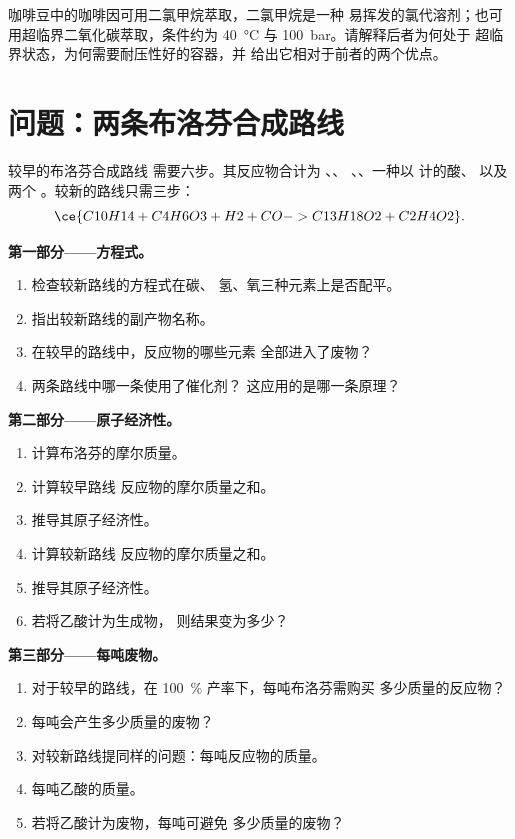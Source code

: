 \begin{exercise}[$\star\star\star$]\label{exo:g12:synthesis-strategy:15}
咖啡豆中的咖啡因可用二氯甲烷萃取，二氯甲烷是一种
易挥发的氯代溶剂；也可用超临界二氧化碳萃取，条件约为
\qty{40}{\celsius} 与 \qty{100}{bar}。请解释后者为何处于
超临界状态，为何需要耐压性好的容器，并
给出它相对于前者的两个优点。
\end{exercise}

\section{问题：两条布洛芬合成路线}

\begin{problem}
\label{pb:g12:synthesis-strategy:1}
较早的布洛芬合成路线  需要六步。其反应物合计为
、、
、、一种以  计的酸、
 以及两个 。较新的路线只需三步：
\[
  \ce{C10H14 + C4H6O3 + H2 + CO -> C13H18O2 + C2H4O2} .
\]

\medskip
\noindent\textbf{第一部分——方程式。}
\begin{enumerate}
  \item 检查较新路线的方程式在碳、
        氢、氧三种元素上是否配平。
  \item 指出较新路线的副产物名称。
  \item 在较早的路线中，反应物的哪些元素
        全部进入了废物？
  \item 两条路线中哪一条使用了催化剂？
        这应用的是哪一条原理？
\end{enumerate}

\medskip
\noindent\textbf{第二部分——原子经济性。}
\begin{enumerate}[resume]
  \item 计算布洛芬的摩尔质量。
  \item 计算较早路线
        反应物的摩尔质量之和。
  \item 推导其原子经济性。
  \item 计算较新路线
        反应物的摩尔质量之和。
  \item 推导其原子经济性。
  \item 若将乙酸计为生成物，
        则结果变为多少？
\end{enumerate}

\medskip
\noindent\textbf{第三部分——每吨废物。}
\begin{enumerate}[resume]
  \item 对于较早的路线，在 \qty{100}{\percent} 产率下，每吨布洛芬需购买
        多少质量的反应物？
  \item 每吨会产生多少质量的废物？
  \item 对较新路线提同样的问题：每吨反应物的质量。
  \item 每吨乙酸的质量。
  \item 若将乙酸计为废物，每吨可避免
        多少质量的废物？
\end{enumerate}


\end{problem}
